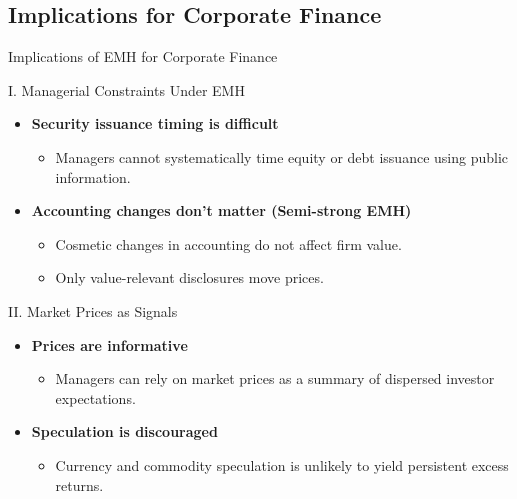 \subsection{Implications for Corporate Finance}
\begin{frame}{Implications of EMH for Corporate Finance}
	\footnotesize
	\begin{block}{I. Managerial Constraints Under EMH}
		\begin{itemize}
        \item \textbf{Security issuance timing is difficult}
        \begin{itemize}
            \item Managers cannot systematically time equity or debt issuance using public information.
        \end{itemize}
			
			\item \textbf{Accounting changes don't matter (Semi-strong EMH)}  
			\begin{itemize}
				\item Cosmetic changes in accounting do not affect firm value.
				\item Only value-relevant disclosures move prices.
			\end{itemize}
		\end{itemize}
	\end{block}

	
	\begin{block}{II. Market Prices as Signals}
		\begin{itemize}
			\item \textbf{Prices are informative}  
			\begin{itemize}
				\item Managers can rely on market prices as a summary of dispersed investor expectations.
			\end{itemize}
			
			\item \textbf{Speculation is discouraged}  
			\begin{itemize}
				\item Currency and commodity speculation is unlikely to yield persistent excess returns.
			\end{itemize}
		\end{itemize}
	\end{block}
	
\end{frame}

